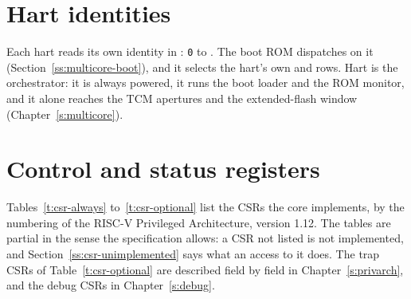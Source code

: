 \documentclass[11pt,pdftex,openany,letterpaper]{report}
\begin{document}
\section{Hart identities} \label{ss:hartids}

Each hart reads its own identity in : \texttt{0} to \texttt{\MaxHartIndex}. The boot ROM dispatches on it (Section~\ref{ss:multicore-boot}), and it selects the hart's own  and  rows.\iforchpresent{} Hart \OrchHartIndex{} is the orchestrator: it is always powered, it runs the boot loader and the ROM monitor, and it alone reaches the TCM apertures and the extended-flash window (Chapter~\ref{s:multicore}).\fi

\section{Control and status registers} \label{ss:csrs}

Tables~\ref{t:csr-always} to~\ref{t:csr-optional} list the CSRs the core implements, by the numbering of the RISC-V Privileged Architecture, version 1.12. The tables are partial in the sense the specification allows: a CSR not listed is not implemented, and Section~\ref{ss:csr-unimplemented} says what an access to it does. The trap CSRs of Table~\ref{t:csr-optional} are described field by field in Chapter~\ref{s:privarch}, and the debug CSRs in Chapter~\ref{s:debug}.
\end{document}
